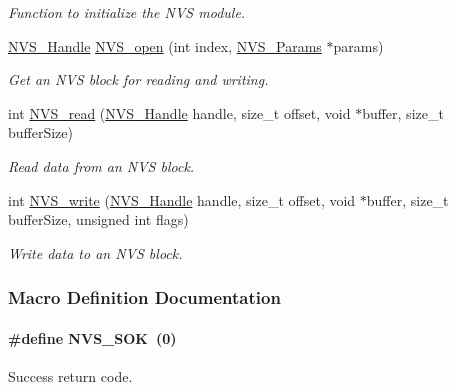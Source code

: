 \begin{DoxyCompactItemize}
\begin{DoxyCompactList}\small\item\em Function to initialize the N\+V\+S module. \end{DoxyCompactList}\item 
\hyperlink{_n_v_s_8h_a1ee0bd7b3cd443236454a8cb1f56ad44}{N\+V\+S\+\_\+\+Handle} \hyperlink{_n_v_s_8h_ad3a3d1f1477312eeee6d2c907a25bd67}{N\+V\+S\+\_\+open} (int index, \hyperlink{struct_n_v_s___params}{N\+V\+S\+\_\+\+Params} $\ast$params)
\begin{DoxyCompactList}\small\item\em Get an N\+V\+S block for reading and writing. \end{DoxyCompactList}\item 
int \hyperlink{_n_v_s_8h_ac966d3124df42478325b6a2f4def117b}{N\+V\+S\+\_\+read} (\hyperlink{_n_v_s_8h_a1ee0bd7b3cd443236454a8cb1f56ad44}{N\+V\+S\+\_\+\+Handle} handle, size\+\_\+t offset, void $\ast$buffer, size\+\_\+t buffer\+Size)
\begin{DoxyCompactList}\small\item\em Read data from an N\+V\+S block. \end{DoxyCompactList}\item 
int \hyperlink{_n_v_s_8h_a2c0acbdec0a65dc725019adb65ad282a}{N\+V\+S\+\_\+write} (\hyperlink{_n_v_s_8h_a1ee0bd7b3cd443236454a8cb1f56ad44}{N\+V\+S\+\_\+\+Handle} handle, size\+\_\+t offset, void $\ast$buffer, size\+\_\+t buffer\+Size, unsigned int flags)
\begin{DoxyCompactList}\small\item\em Write data to an N\+V\+S block. \end{DoxyCompactList}\end{DoxyCompactItemize}


\subsubsection{Macro Definition Documentation}
\paragraph[{N\+V\+S\+\_\+\+S\+O\+K}]{\setlength{\rightskip}{0pt plus 5cm}\#define N\+V\+S\+\_\+\+S\+O\+K~(0)}\label{_n_v_s_8h_a6ea76de6ce4b7acecab17c0a1d900d90}


Success return code. 


